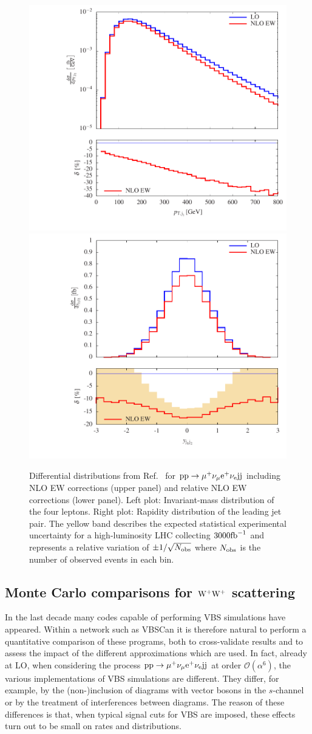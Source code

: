 \begin{figure}
\includegraphics[width=.47\textwidth]{WG1_plots/histogram_transverse_momentum_j1_ew}
\includegraphics[width=.47\textwidth]{WG1_plots/histogram_rapidity_j1j2_ew}
\caption{Differential distributions from Ref.~\cite{Biedermann:2016yds} for ${\rm p}{\rm p}\to\mu^+\nu_\mu{\rm e}^+\nu_{\rm e}{\rm j}{\rm j}$ including NLO EW corrections (upper panel) and relative NLO EW corrections (lower panel).
Left plot: Invariant-mass distribution of the four leptons.
Right plot: Rapidity distribution of the leading jet pair.
The yellow band describes the expected statistical experimental uncertainty for a high-luminosity LHC collecting $3000{\rm fb}^{-1}$ and represents a relative variation of $\pm 1/\sqrt{N_{\rm obs}}$ where $N_{\rm obs}$ is the number of observed events in each bin.}
\label{fig:VBSEW}
\end{figure}

\subsection{Monte Carlo comparisons for ${\rm W^+ W^+}$ scattering}
In the last decade many codes capable of performing VBS simulations have appeared.
Within a network such as VBSCan it is therefore natural to perform 
a quantitative comparison of these programs, both to cross-validate results and to assess the impact of the different approximations which are used.
In fact, already at LO, when considering the process ${\rm p}{\rm p}\to\mu^+\nu_\mu{\rm e}^+\nu_{\rm e}{\rm j}{\rm j}$ at order $\mathcal O (\alpha^6)$, the various implementations of VBS simulations are different.
They differ, for example,
by the (non-)inclusion of diagrams with vector bosons in the $s$-channel or by the treatment of interferences between diagrams.
The reason of these differences is that, when typical signal cuts for VBS are imposed, these effects turn out to be small on rates and distributions.

